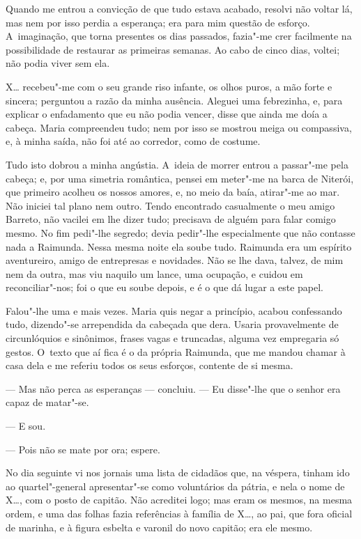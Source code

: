 \begin{linenumbers}
Quando me entrou a convicção de que tudo estava acabado, resolvi não
voltar lá, mas nem por isso perdia a esperança; era para mim questão de
esforço. A~imaginação, que torna presentes os dias passados, fazia"-me
crer facilmente na possibilidade de restaurar as primeiras semanas. Ao
cabo de cinco dias, voltei; não podia viver sem ela.

X\ldots{} recebeu"-me com o seu grande riso infante, os olhos puros, a mão
forte e sincera; perguntou a razão da minha ausência. Aleguei uma
febrezinha, e, para explicar o enfadamento que eu não podia vencer,
disse que ainda me doía a cabeça. Maria compreendeu tudo; nem por isso
se mostrou meiga ou compassiva, e, à minha saída, não foi até ao
corredor, como de costume.

Tudo isto dobrou a minha angústia. A~ideia de morrer entrou a passar"-me
pela cabeça; e, por uma simetria romântica, pensei em meter"-me na barca
de Niterói, que primeiro acolheu os nossos amores, e, no meio da baía,
atirar"-me ao mar. Não iniciei tal plano nem outro. Tendo encontrado
casualmente o meu amigo Barreto, não vacilei em lhe dizer tudo;
precisava de alguém para falar comigo mesmo. No fim pedi"-lhe segredo;
devia pedir"-lhe especialmente que não contasse nada a Raimunda. Nessa
mesma noite ela soube tudo. Raimunda era um espírito aventureiro, amigo
de entrepresas e novidades. Não se lhe dava, talvez, de mim nem da
outra, mas viu naquilo um lance, uma ocupação, e cuidou em
reconciliar"-nos; foi o que eu soube depois, e é o que dá lugar a este
papel.

Falou"-lhe uma e mais vezes. Maria quis negar a princípio, acabou
confessando tudo, dizendo"-se arrependida da cabeçada que dera. Usaria
provavelmente de circunlóquios e sinônimos, frases vagas e truncadas,
alguma vez empregaria só gestos. O~texto que aí fica é o da própria
Raimunda, que me mandou chamar à casa dela e me referiu todos os seus
esforços, contente de si mesma.

--- Mas não perca as esperanças --- concluiu. --- Eu disse"-lhe que o senhor
era capaz de matar"-se.

--- E sou.

--- Pois não se mate por ora; espere.

No dia seguinte vi nos jornais uma lista de cidadãos que, na véspera,
tinham ido ao quartel"-general apresentar"-se como voluntários da pátria,
e nela o nome de X\ldots{}, com o posto de capitão. Não acreditei logo; mas
eram os mesmos, na mesma ordem, e uma das folhas fazia referências à
família de X\ldots{}, ao pai, que fora oficial de marinha, e à figura esbelta
e varonil do novo capitão; era ele mesmo.


\end{linenumbers}
